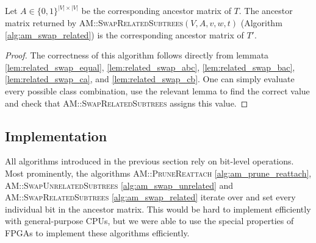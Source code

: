 \begin{theorem}
    \label{theo:swap_related_correctness}
    Let $A \in \{0,1\}^{|V| \times |V|}$ be the corresponding ancestor matrix of $T$. The ancestor matrix returned by \textsc{AM::Swap\-Related\-Subtrees}$(V, A, v, w, t)$ (Algorithm \ref{alg:am_swap_related}) is the corresponding ancestor matrix of $T'$.
\end{theorem}

\begin{proof}
    The correctness of this algorithm follows directly from lemmata \ref{lem:related_swap_equal}, \ref{lem:related_swap_abc}, \ref{lem:related_swap_bac}, \ref{lem:related_swap_ca}, and \ref{lem:related_swap_cb}. One can simply evaluate every possible class combination, use the relevant lemma to find the correct value and check that \textsc{AM::SwapRelatedSubtrees} assigns this value.
\end{proof}

\subsection{Implementation}
\label{sec:encoding_implementation}

All algorithms introduced in the previous section rely on bit-level operations. Most prominently, the algorithms \textsc{AM::PruneReattach} \ref{alg:am_prune_reattach}, \textsc{AM::SwapUnrelatedSubtrees} \ref{alg:am_swap_unrelated} and \textsc{AM::SwapRelatedSubtrees} \ref{alg:am_swap_related} iterate over and set every individual bit in the ancestor matrix. This would be hard to implement efficiently with general-purpose \acp{CPU}, but we were able to use the special properties of \acp{FPGA} to implement these algorithms efficiently.


